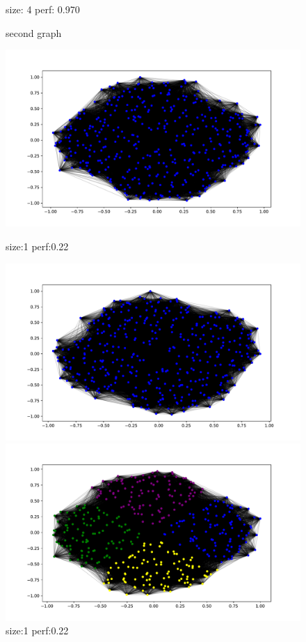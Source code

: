\documentclass{article}
\begin{document}
\begin{figure}[!ht]
\begin{minipage}{.33\textwidth}
  \caption*{size: 4 perf: 0.970}
\end{minipage}
\caption{second graph}
\end{figure}


\begin{figure}[!ht]
\centering
\begin{minipage}{.33\textwidth}
  \centering
  \includegraphics[width=\linewidth]{plots/images3/LabelPropagation.pdf}
  \caption*{size:1 perf:0.22}
\end{minipage}%
\begin{minipage}{.33\textwidth}
  \centering
  \includegraphics[width=\linewidth]{plots/images3/ex3minimalDegree.pdf}
  \caption*{size:1 perf:0.22}
\end{minipage}
\begin{minipage}{.33\textwidth}
  \centering
  \includegraphics[width=\linewidth]{plots/images3/Louvain.pdf}

\end{minipage}
\end{figure}
\end{document}
